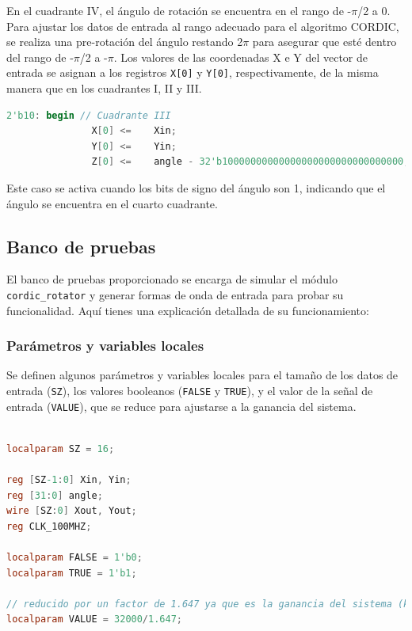 \documentclass[12pt,a4paper, twoside]{article} %
\begin{document}
En el cuadrante IV, el ángulo de rotación se encuentra en el rango de -$\pi$/2 a 0. Para ajustar los datos de entrada al rango adecuado para el algoritmo CORDIC, se realiza una pre-rotación del ángulo restando 2$\pi$ para asegurar que esté dentro del rango de -$\pi$/2 a -$\pi$. Los valores de las coordenadas X e Y del vector de entrada se asignan a los registros \texttt{X[0]} y \texttt{Y[0]}, respectivamente, de la misma manera que en los cuadrantes I, II y III.


\begin{lstlisting}[language=Verilog]
       2'b10: begin // Cuadrante III
               X[0] <=    Xin;
               Y[0] <=    Yin;
               Z[0] <=    angle - 32'b10000000000000000000000000000000; 
\end{lstlisting}

Este caso se activa cuando los bits de signo del ángulo son 1, indicando que el ángulo se encuentra en el cuarto cuadrante.



\subsection{Banco de pruebas}

El banco de pruebas proporcionado se encarga de simular el módulo \texttt{cordic\_rotator} y generar formas de onda de entrada para probar su funcionalidad. Aquí tienes una explicación detallada de su funcionamiento:

\subsubsection{Parámetros y variables locales}
Se definen algunos parámetros y variables locales para el tamaño de los datos de entrada (\texttt{SZ}), los valores booleanos (\texttt{FALSE} y \texttt{TRUE}), y el valor de la señal de entrada (\texttt{VALUE}), que se reduce para ajustarse a la ganancia del sistema.

\begin{lstlisting}[language=Verilog]

localparam SZ = 16; 

reg [SZ-1:0] Xin, Yin;
reg [31:0] angle;
wire [SZ:0] Xout, Yout;
reg CLK_100MHZ;

localparam FALSE = 1'b0;
localparam TRUE = 1'b1;

// reducido por un factor de 1.647 ya que es la ganancia del sistema (k)
localparam VALUE = 32000/1.647; 

\end{lstlisting}
\end{document}
